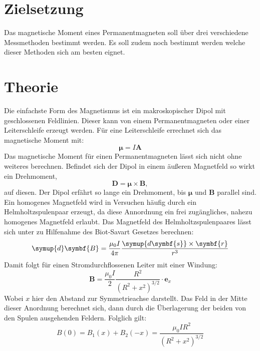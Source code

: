 \section{Zielsetzung}
Das magnetische Moment eines Permanentmagneten soll über drei verschiedene Messmethoden bestimmt werden.
Es soll zudem noch bestimmt werden welche dieser Methoden sich am besten eignet.
\section{Theorie}
\label{sec:Theorie}
Die einfachste Form des Magnetismus ist ein makroskopischer Dipol mit geschlossenen Feldlinien.
Dieser kann von einem Permanentmagneten oder einer Leiterschleife erzeugt werden.
Für eine Leiterschleife errechnet sich das magnetische Moment mit:
\begin{equation}
  \symbf{\mu} = I \symbf{A}
\end{equation}
Das magnetische Moment für einen Permanentmagneten lässt sich nicht ohne weiteres berechnen.
Befindet sich der Dipol in einem äußeren Magnetfeld so wirkt ein Drehmoment,
\begin{equation}
  \symbf{D} = \symbf{\mu}\times \symbf{B},
\end{equation}
auf diesen.
Der Dipol erfährt so lange ein Drehmoment, bis $\symbf{\mu}$ und $\symbf{B}$ parallel sind.
Ein homogenes Magnetfeld wird in Versuchen häufig durch ein Helmholtzspulenpaar erzeugt, da diese Annordnung ein frei
zugängliches, nahezu homogenes Magnetfeld erlaubt.
Das Magnetfeld des Helmholtzspulenpaares lässt sich unter zu Hilfenahme des Biot-Savart Gesetzes berechnen:
\begin{equation}
\symup{d}\symbf{B}= \frac{\mu_0 I}{4 \pi} \frac{\symup{d\symbf{s}}\times \symbf{r}}{r^3}
\end{equation}
Damit folgt für einen Stromdurchflossenen Leiter mit einer Windung:
\begin{equation}
  \symbf{B}=\frac{\mu_0 I}{2} \frac{R^2}{(R^2 + x^2)^{3/2}} \cdot \symbf{e}_x
\end{equation}
Wobei $x$ hier den Abstand zur Symmetrieachse darstellt.
Das Feld in der Mitte dieser Anordnung berechnet sich, dann durch die Überlagerung der beiden von den Spulen ausgehenden
Feldern.
Folglich gilt:
\begin{equation}
    \label{eq:bfeld}
    B(0)= B_1(x)+B_2(-x) = \frac{\mu_0 I R^2}{(R^2+x^2)^{3/2}}
\end{equation}
%
